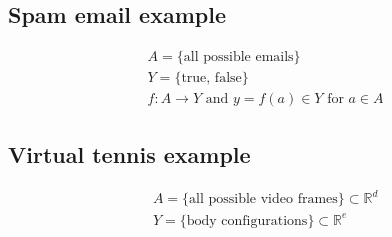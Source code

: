 \documentclass[titlepage, 12pt, leqno]{article}
\begin{document}
\subsection{Spam email example}
\begin{align*}
    & A = \{ \text{all possible emails} \} \\
    & Y = \{ \text{true, false} \} \\
    & f : A \rightarrow Y \text{ and } y = f(a) \in Y \text{ for } a \in A
\end{align*}

\subsection{Virtual tennis example}
\begin{align*}
    & A = \{ \text{all possible video frames} \} \subset \mathbb{R}^d \\
    & Y = \{ \text{body configurations} \} \subset \mathbb{R}^e
\end{align*}
\end{document}
